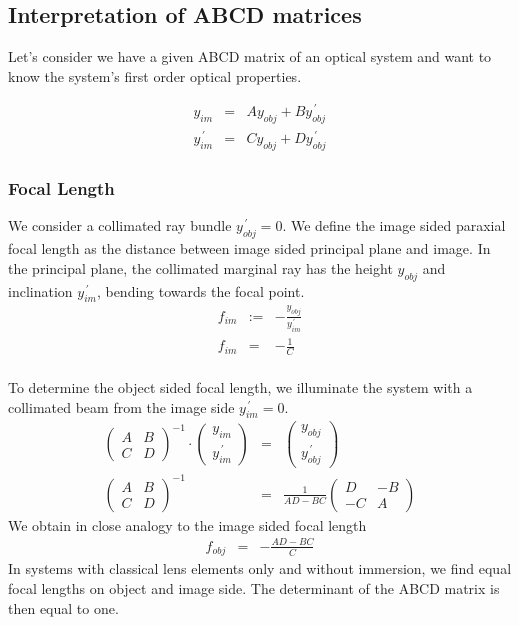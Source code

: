 \documentclass[12pt,a4paper,twoside,openright,BCOR10mm,headsepline,titlepage,abstracton,chapterprefix,final]{scrreprt}
\begin{document}
\subsection{Interpretation of ABCD matrices}
Let's consider we have a given ABCD matrix of an optical system and want to know the system's first order optical properties.

\begin{eqnarray}
  y_{im} &=& A y_{obj} + B y_{obj}^{\,\prime}
  \\ 
  y_{im}^{\,\prime} &=& C y_{obj} + D y_{obj}^{\,\prime}
\end{eqnarray}

\subsubsection{Focal Length}
We consider a collimated ray bundle $y_{obj}^{\,\prime} = 0$.
We define the image sided paraxial focal length as the distance between image sided principal plane and image.
In the principal plane, the collimated marginal ray has the height $y_{obj}$ and inclination $y_{im}^{\,\prime}$, bending towards the focal point.
\begin{eqnarray}
 f_{im} &:=& - \frac{ y_{obj} }{ y_{im}^{\,\prime} } 
 \\
 f_{im} &=& - \frac{ 1 }{ C } \\ 
\end{eqnarray}

To determine the object sided focal length, we illuminate the system with a collimated beam from the image side $y_{im}^{\,\prime}=0$.
\begin{eqnarray}
 \begin{pmatrix}
  A & B \\ C & D
 \end{pmatrix}^{-1}
 \cdot
 \begin{pmatrix}
  y_{im} \\ y_{im}^{\,\prime}
 \end{pmatrix}
 &=&
 \begin{pmatrix}
  y_{obj} \\ y_{obj}^{\,\prime}
 \end{pmatrix}
\\
  \begin{pmatrix}
  A & B \\ C & D
 \end{pmatrix}^{-1}
 &=&
 \frac{1}{AD-BC}
  \begin{pmatrix}
  D & - B \\ -C & A
 \end{pmatrix}
\end{eqnarray}
We obtain in close analogy to the image sided focal length
\begin{eqnarray}
 f_{obj} &=& - \frac{AD-BC}{C}
\end{eqnarray}
In systems with classical lens elements only and without immersion, 
we find equal focal lengths on object and image side. The determinant of the ABCD matrix is then equal to one.
\end{document}
